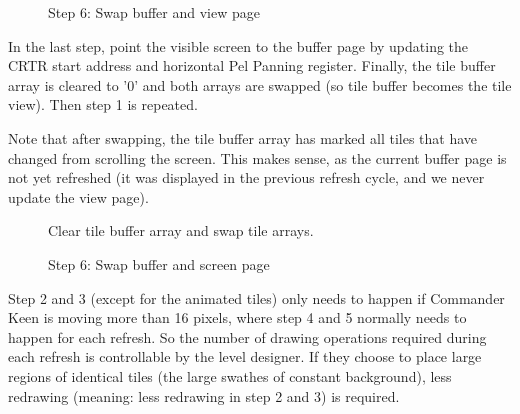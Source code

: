 \documentclass[book.tex]{subfiles}
\begin{document}
\pagebreak


\begin{figure}[H]
\centering
 \caption{Step 6: Swap buffer and view page}
 \label{fig:kc1_3_update_final}
\end{figure}


In the last step, point the visible screen to the buffer page by updating the CRTR start address and horizontal Pel Panning register. Finally, the tile buffer array is cleared to '0' and both arrays are swapped (so tile buffer becomes the tile view). Then step 1 is repeated. \\
\par
Note that after swapping, the tile buffer array has marked all tiles that have changed from scrolling the screen. This makes sense, as the current buffer page is not yet refreshed (it was displayed in the previous refresh cycle, and we never update the view page). 

\begin{figure}[H]
\centering
 \caption{Clear tile buffer array and swap tile arrays.}
 \label{fig:kc1_3_tile_final}
\end{figure}


\pagebreak

\begin{figure}[H]
\centering
 \caption{Step 6: Swap buffer and screen page}
 \label{fig:kc1_3_update_final}
\end{figure}

Step 2 and 3 (except for the animated tiles) only needs to happen if Commander Keen is moving more than 16 pixels, where step 4 and 5 normally needs to happen for each refresh.
So the number of drawing operations required during each refresh is controllable by the level designer. If they choose to place large regions of identical tiles (the large swathes of constant background), less redrawing (meaning: less redrawing in step 2 and 3) is required.

\pagebreak
\end{document}
